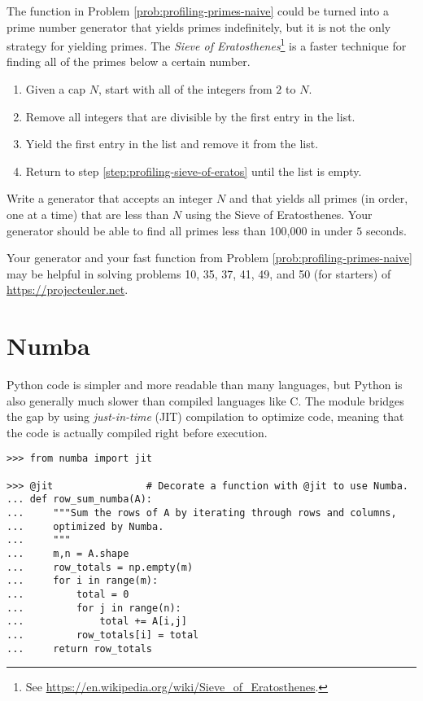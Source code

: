 \begin{problem} %
The function in Problem \ref{prob:profiling-primes-naive} could be turned into a prime number generator that yields primes indefinitely, but it is not the only strategy for yielding primes.
The \emph{Sieve of Eratosthenes}\footnote{See \url{https://en.wikipedia.org/wiki/Sieve_of_Eratosthenes}.} is a faster technique for finding all of the primes below a certain number.
\begin{enumerate}
\item Given a cap $N$, start with all of the integers from $2$ to $N$.
\item Remove all integers that are divisible by the first entry in the list. \label{step:profiling-sieve-of-eratos}
\item Yield the first entry in the list and remove it from the list.
\item Return to step \ref{step:profiling-sieve-of-eratos} until the list is empty.
\end{enumerate}

Write a generator that accepts an integer $N$ and that yields all primes (in order, one at a time) that are less than $N$ using the Sieve of Eratosthenes.
Your generator should be able to find all primes less than 100,000 in under $5$ seconds.

Your generator and your fast function from Problem \ref{prob:profiling-primes-naive} may be helpful in solving problems 10, 35, 37, 41, 49, and 50 (for starters) of \url{https://projecteuler.net}.
\end{problem}

\section*{Numba} %

Python code is simpler and more readable than many languages, but Python is also generally much slower than compiled languages like C.
The  module
bridges the gap by using \emph{just-in-time} (JIT) compilation to optimize code, meaning that the code is actually compiled right before execution.

\begin{lstlisting}
>>> from numba import jit

>>> @jit                # Decorate a function with @jit to use Numba.
... def row_sum_numba(A):
...     """Sum the rows of A by iterating through rows and columns,
...     optimized by Numba.
...     """
...     m,n = A.shape
...     row_totals = np.empty(m)
...     for i in range(m):
...         total = 0
...         for j in range(n):
...             total += A[i,j]
...         row_totals[i] = total
...     return row_totals
\end{lstlisting}


